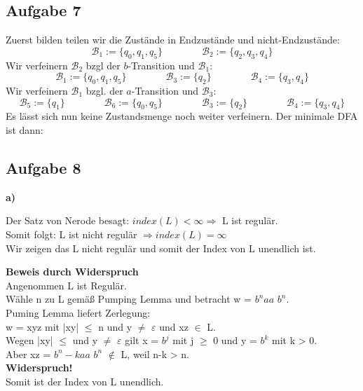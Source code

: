 \documentclass[a4paper,graphics,11pt]{article}
\newcommand{\aufgabe}[1]{\subsection*{Aufgabe #1}}
\begin{document}
\aufgabe{7}
Zuerst bilden teilen wir die Zustände in Endzustände und nicht-Endzustände:
$$
    \mathcal{B}_1 := \{q_0, q_1, q_5\}
    \qquad\qquad
    \mathcal{B}_2 := \{q_2, q_3, q_4\}
$$
Wir verfeinern $\mathcal{B}_2$ bzgl der $b$-Transition und $\mathcal{B}_1$:
$$
    \mathcal{B}_1 := \{q_0, q_1, q_5\}
    \qquad\qquad
    \mathcal{B}_3 := \{q_2\}
    \qquad\qquad
    \mathcal{B}_4 := \{q_3, q_4\}
$$
Wir verfeinern $\mathcal{B}_1$ bzgl. der $a$-Transition und $\mathcal{B}_3$:
$$
    \mathcal{B}_5 := \{q_1\}
    \qquad\qquad
    \mathcal{B}_6 := \{q_0, q_5\}
    \qquad\qquad
    \mathcal{B}_3 := \{q_2\}
    \qquad\qquad
    \mathcal{B}_4 := \{q_3, q_4\}
$$
Es lässt sich nun keine Zustandsmenge noch weiter verfeinern.
Der minimale DFA ist dann:
\begin{center}
\end{center}

\newpage
\aufgabe{8}

\textbf{a)}

Der Satz von Nerode besagt: $index(L) < \infty \Rightarrow$ L ist regulär.\\
Somit folgt: L ist nicht regulär $\Rightarrow index(L) = \infty$\\
Wir zeigen das L nicht regulär und somit der Index von L unendlich ist.

\textbf{Beweis durch Widerspruch}\\
Angenommen L ist Regulär.\\
Wähle n zu L gemäß Pumping Lemma und betracht w = $b^n aa $ $b^n$.\\
Puming Lemma liefert Zerlegung:\\
w = xyz mit |xy| $\leq$ n und y $\neq$ $\varepsilon$ und xz $\in$ L.\\
Wegen |xy| $\leq$ und y $\neq$ $\varepsilon$ gilt x = $b^j$ mit j $\geq$ 0 und y = $b^k$ mit k > 0.\\
Aber xz = $b^n-k aa$ $b^n$ $\not\in$ L, weil n-k > n.\\
\textbf{Widerspruch!}\\
Somit ist der Index von L unendlich.
\end{document}
